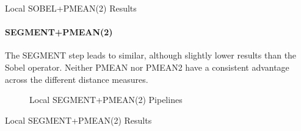 \begin{table}[h]
    \centering
    \quad
    \caption[Local SOBEL+PMEAN(2) Results]{
        Local SOBEL+PMEAN(2) Results
    }
    \label{tab:results_local_luma_sobel_pmean_all}
\end{table}

\FloatBarrier
\paragraph{SEGMENT+PMEAN(2)}

The SEGMENT step leads to similar, although slightly lower results than the
Sobel operator. Neither PMEAN nor PMEAN2 have a consistent advantage across the
different distance measures.

\begin{figure}[h]
    \centering
    
    \caption[Local SEGMENT+PMEAN(2) Pipelines]{
        Local SEGMENT+PMEAN(2) Pipelines
    }
    \label{fig:pipeline_local_luma_segment_pmean}
\end{figure}

\begin{table}[h]
    \centering
    \quad
    \caption[Local SEGMENT+PMEAN(2) Results]{
        Local SEGMENT+PMEAN(2) Results
    }
    \label{tab:results_local_luma_segment_pmean_all}
\end{table}

\FloatBarrier
